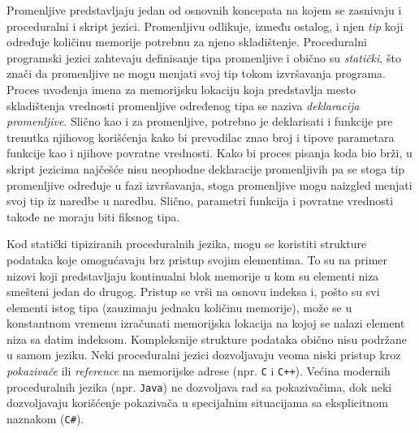 Promenljive predstavljaju jedan od osnovnih koncepata na kojem se zasnivaju i proceduralni i skript jezici. Promenljivu odlikuje, između ostalog, i njen \emph{tip} koji određuje količinu memorije potrebnu za njeno skladištenje. Proceduralni programski jezici zahtevaju definisanje tipa promenljive i obično su \emph{statički}, što znači da promenljive ne mogu menjati svoj tip tokom izvršavanja programa. Proces uvođenja imena za memorijsku lokaciju koja predstavlja mesto skladištenja vrednosti promenljive određenog tipa se naziva \emph{deklaracija promenljive}. Slično kao i za promenljive, potrebno je deklarisati i funkcije pre trenutka njihovog korišćenja kako bi prevodilac znao broj i tipove parametara funkcije kao i njihove povratne vrednosti. Kako bi proces pisanja koda bio brži, u skript jezicima najčešće nisu neophodne deklaracije promenljivih pa se stoga tip promenljive određuje u fazi izvršavanja, stoga promenljive mogu naizgled menjati svoj tip iz naredbe u naredbu. Slično, parametri funkcija i povratne vrednosti takođe ne moraju biti fiksnog tipa. 

Kod statički tipiziranih proceduralnih jezika, mogu se koristiti strukture podataka koje omogućavaju brz pristup svojim elementima. To su na primer nizovi koji predstavljaju kontinualni blok memorije u kom su elementi niza smešteni jedan do drugog. Pristup se vrši na osnovu indeksa i, pošto su svi elementi istog tipa (zauzimaju jednaku količinu memorije), može se u konstantnom vremenu izračunati memorijska lokacija na kojoj se nalazi element niza sa datim indeksom. Kompleksnije strukture podataka obično nisu podržane u samom jeziku. Neki proceduralni jezici dozvoljavaju veoma niski pristup kroz \emph{pokazivače} ili \emph{reference} na memorijske adrese (npr. \texttt{C} i \texttt{C++}). Većina modernih proceduralnih jezika (npr. \texttt{Java}) ne dozvoljava rad sa pokazivačima, dok neki dozvoljavaju korišćenje pokazivača u specijalnim situacijama sa eksplicitnom naznakom (\texttt{C\#}).


